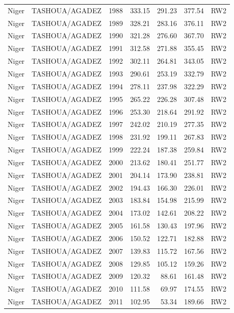 \begin{longtable}{lllrrrl}
  Niger & TASHOUA/AGADEZ & 1988 & 333.15 & 291.23 & 377.54 & RW2 \\ 
  Niger & TASHOUA/AGADEZ & 1989 & 328.21 & 283.16 & 376.11 & RW2 \\ 
  Niger & TASHOUA/AGADEZ & 1990 & 321.28 & 276.60 & 367.70 & RW2 \\ 
  Niger & TASHOUA/AGADEZ & 1991 & 312.58 & 271.88 & 355.45 & RW2 \\ 
  Niger & TASHOUA/AGADEZ & 1992 & 302.11 & 264.81 & 343.05 & RW2 \\ 
  Niger & TASHOUA/AGADEZ & 1993 & 290.61 & 253.19 & 332.79 & RW2 \\ 
  Niger & TASHOUA/AGADEZ & 1994 & 278.11 & 237.98 & 322.29 & RW2 \\ 
  Niger & TASHOUA/AGADEZ & 1995 & 265.22 & 226.28 & 307.48 & RW2 \\ 
  Niger & TASHOUA/AGADEZ & 1996 & 253.30 & 218.64 & 291.92 & RW2 \\ 
  Niger & TASHOUA/AGADEZ & 1997 & 242.02 & 210.19 & 277.35 & RW2 \\ 
  Niger & TASHOUA/AGADEZ & 1998 & 231.92 & 199.11 & 267.83 & RW2 \\ 
  Niger & TASHOUA/AGADEZ & 1999 & 222.24 & 187.38 & 259.84 & RW2 \\ 
  Niger & TASHOUA/AGADEZ & 2000 & 213.62 & 180.41 & 251.77 & RW2 \\ 
  Niger & TASHOUA/AGADEZ & 2001 & 204.14 & 173.90 & 238.81 & RW2 \\ 
  Niger & TASHOUA/AGADEZ & 2002 & 194.43 & 166.30 & 226.01 & RW2 \\ 
  Niger & TASHOUA/AGADEZ & 2003 & 183.84 & 154.98 & 215.99 & RW2 \\ 
  Niger & TASHOUA/AGADEZ & 2004 & 173.02 & 142.61 & 208.22 & RW2 \\ 
  Niger & TASHOUA/AGADEZ & 2005 & 161.58 & 130.43 & 197.96 & RW2 \\ 
  Niger & TASHOUA/AGADEZ & 2006 & 150.52 & 122.71 & 182.88 & RW2 \\ 
  Niger & TASHOUA/AGADEZ & 2007 & 139.83 & 115.72 & 167.56 & RW2 \\ 
  Niger & TASHOUA/AGADEZ & 2008 & 129.85 & 105.12 & 159.26 & RW2 \\ 
  Niger & TASHOUA/AGADEZ & 2009 & 120.32 & 88.61 & 161.48 & RW2 \\ 
  Niger & TASHOUA/AGADEZ & 2010 & 111.58 & 69.97 & 174.55 & RW2 \\ 
  Niger & TASHOUA/AGADEZ & 2011 & 102.95 & 53.34 & 189.66 & RW2 \\ 

\end{longtable}
